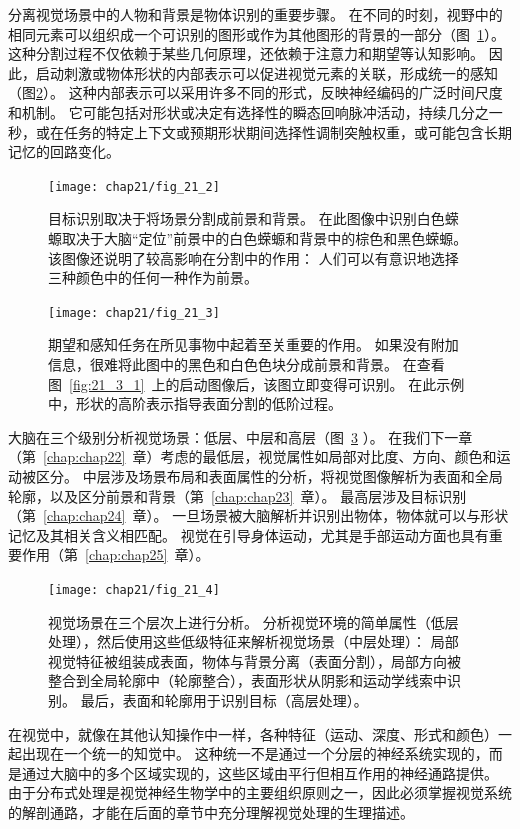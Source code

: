 分离视觉场景中的人物和背景是物体识别的重要步骤。
在不同的时刻，视野中的相同元素可以组织成一个可识别的图形或作为其他图形的背景的一部分（图~\ref{fig:21_2}）。
这种分割过程不仅依赖于某些几何原理，还依赖于注意力和期望等认知影响。
因此，启动刺激或物体形状的内部表示可以促进视觉元素的关联，形成统一的感知（图\ref{fig:21_3}）。
这种内部表示可以采用许多不同的形式，反映神经编码的广泛时间尺度和机制。
它可能包括对形状或决定有选择性的瞬态回响脉冲活动，持续几分之一秒，或在任务的特定上下文或预期形状期间选择性调制突触权重，或可能包含长期记忆的回路变化。


\begin{figure}[htbp]
	\centering
	\texttt{[image: chap21/fig\_21\_2]}
	\caption{目标识别取决于将场景分割成前景和背景。
		在此图像中识别白色蝾螈取决于大脑“定位”前景中的白色蝾螈和背景中的棕色和黑色蝾螈。
		该图像还说明了较高影响在分割中的作用：
		人们可以有意识地选择三种颜色中的任何一种作为前景。}
	\label{fig:21_2}
\end{figure}


\begin{figure}[htbp]
	\centering
	\texttt{[image: chap21/fig\_21\_3]}
	\caption{期望和感知任务在所见事物中起着至关重要的作用。
		如果没有附加信息，很难将此图中的黑色和白色色块分成前景和背景。
		在查看图~\ref{fig:21_3_1}~上的启动图像后，该图立即变得可识别。
		在此示例中，形状的高阶表示指导表面分割的低阶过程。}
	\label{fig:21_3}
\end{figure}


大脑在三个级别分析视觉场景：低层、中层和高层（图~\ref{fig:21_4} ）。
在我们下一章（第~\ref{chap:chap22}~章）考虑的最低层，视觉属性如局部对比度、方向、颜色和运动被区分。
中层涉及场景布局和表面属性的分析，将视觉图像解析为表面和全局轮廓，以及区分前景和背景（第~\ref{chap:chap23}~章）。
最高层涉及目标识别（第~\ref{chap:chap24}~章）。
一旦场景被大脑解析并识别出物体，物体就可以与形状记忆及其相关含义相匹配。
视觉在引导身体运动，尤其是手部运动方面也具有重要作用（第~\ref{chap:chap25}~章）。


\begin{figure}[htbp]
	\centering
	\texttt{[image: chap21/fig\_21\_4]}
	\caption{视觉场景在三个层次上进行分析。
		分析视觉环境的简单属性（低层处理），然后使用这些低级特征来解析视觉场景（中层处理）：
		局部视觉特征被组装成表面，物体与背景分离（表面分割），局部方向被整合到全局轮廓中（轮廓整合），表面形状从阴影和运动学线索中识别。
		最后，表面和轮廓用于识别目标（高层处理）。}
	\label{fig:21_4}
\end{figure}


在视觉中，就像在其他认知操作中一样，各种特征（运动、深度、形式和颜色）一起出现在一个统一的知觉中。
这种统一不是通过一个分层的神经系统实现的，而是通过大脑中的多个区域实现的，这些区域由平行但相互作用的神经通路提供。
由于分布式处理是视觉神经生物学中的主要组织原则之一，因此必须掌握视觉系统的解剖通路，才能在后面的章节中充分理解视觉处理的生理描述。


